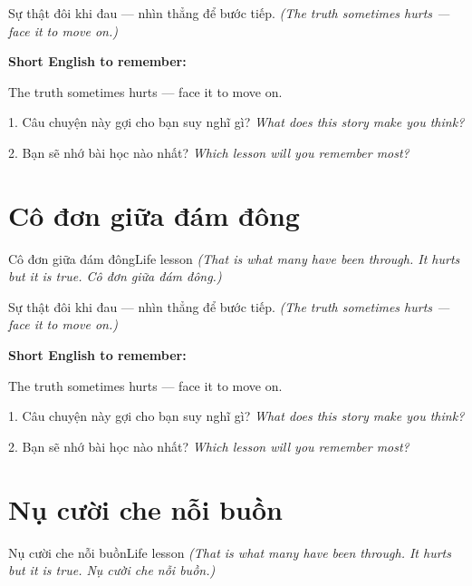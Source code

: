 \begin{baihoc}
Sự thật đôi khi đau — nhìn thẳng để bước tiếp.
\textit{(The truth sometimes hurts — face it to move on.)}
\end{baihoc}

\begin{ghinhoanh}
\textbf{Short English to remember:}

The truth sometimes hurts — face it to move on.

\end{ghinhoanh}

\begin{tuhocnhanh}
1. Câu chuyện này gợi cho bạn suy nghĩ gì? \textit{What does this story make you think?}

2. Bạn sẽ nhớ bài học nào nhất? \textit{Which lesson will you remember most?}
\end{tuhocnhanh}
\ngancach


\section{Cô đơn giữa đám đông}
\begin{truyen}{Cô đơn giữa đám đông}{Life lesson}
\textit{(That is what many have been through. It hurts but it is true. Cô đơn giữa đám đông.)}
\end{truyen}

\begin{baihoc}
Sự thật đôi khi đau — nhìn thẳng để bước tiếp.
\textit{(The truth sometimes hurts — face it to move on.)}
\end{baihoc}

\begin{ghinhoanh}
\textbf{Short English to remember:}

The truth sometimes hurts — face it to move on.

\end{ghinhoanh}

\begin{tuhocnhanh}
1. Câu chuyện này gợi cho bạn suy nghĩ gì? \textit{What does this story make you think?}

2. Bạn sẽ nhớ bài học nào nhất? \textit{Which lesson will you remember most?}
\end{tuhocnhanh}
\ngancach


\section{Nụ cười che nỗi buồn}
\begin{truyen}{Nụ cười che nỗi buồn}{Life lesson}
\textit{(That is what many have been through. It hurts but it is true. Nụ cười che nỗi buồn.)}
\end{truyen}

